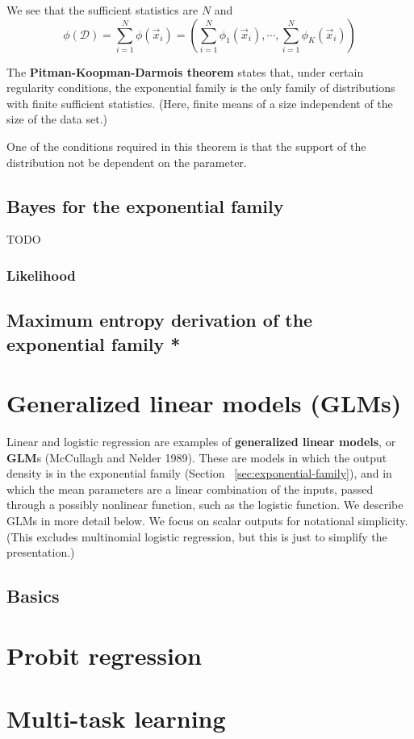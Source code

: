 We see that the sufficient statistics are $N$ and
\begin{equation}
\phi(\mathcal{D})=\sum\limits_{i=1}^N \phi(\vec{x}_i)=(\sum\limits_{i=1}^N \phi_1(\vec{x}_i),\cdots,\sum\limits_{i=1}^N \phi_K(\vec{x}_i))
\end{equation}

The \textbf{Pitman-Koopman-Darmois theorem} states that, under certain regularity conditions, the exponential family is the only family of distributions with finite sufficient statistics. (Here, finite means of a size independent of the size of the data set.)

One of the conditions required in this theorem is that the support of the distribution not be dependent on the parameter.


\subsection{Bayes for the exponential family}
\label{sec:Bayes-for-the-exponential-family}
TODO


\subsubsection{Likelihood}



\subsection{Maximum entropy derivation of the exponential family *}
\label{sec:Maximum-entropy-derivation-of-the-exponential-family}



\section{Generalized linear models (GLMs)}
\label{sec:GLMs}
Linear and logistic regression are examples of \textbf{generalized linear models}, or \textbf{GLM}s (McCullagh and Nelder 1989). These are models in which the output density is in the exponential family (Section ~\ref{sec:exponential-family}), and in which the mean parameters are a linear combination of the inputs, passed through a possibly nonlinear function, such as the logistic function. We describe GLMs in more detail below. We focus on scalar outputs for notational simplicity. (This excludes multinomial logistic regression, but this is just to simplify the presentation.)


\subsection{Basics}



\section{Probit regression}



\section{Multi-task learning}



